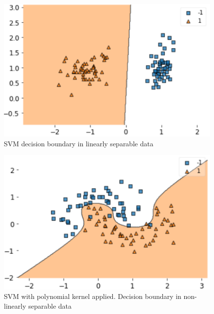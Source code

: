\documentclass[10pt,twocolumn,letterpaper]{article}
\begin{document}
\vspace{3.00mm} 

\begin{figure}[htb]
  \includegraphics[width=\linewidth]{svm_lin_sep.png}
  \caption{SVM decision boundary in linearly separable data}
  \label{fig:svm_exp_lin}
\end{figure}

\vspace{50.00mm} 

\begin{figure}[htb]
  \includegraphics[width=\linewidth]{svm_k_non.png}
  \caption{SVM with polynomial kernel applied. Decision boundary in non-linearly separable data}
  \label{fig:svm_exp_k}
\end{figure}
\end{document}
